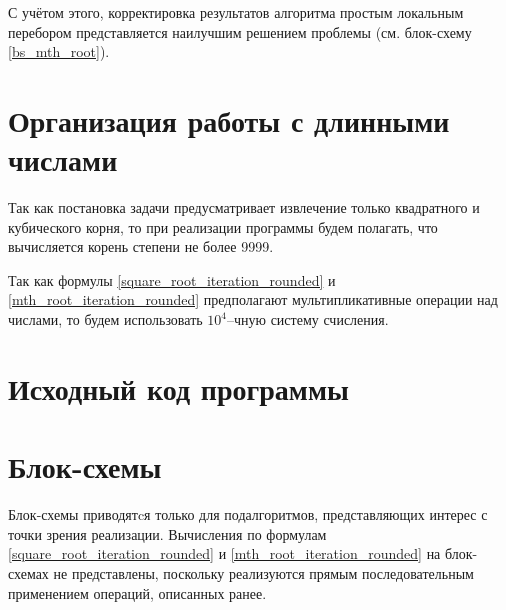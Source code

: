 \documentclass[a4paper,12pt]{article} %
\begin{document}
С учётом этого, корректировка результатов алгоритма простым локальным перебором
представляется наилучшим решением проблемы (см. блок-схему \ref{bs_mth_root}).


\section*{Организация работы с длинными числами}
Так как постановка задачи предусматривает извлечение только квадратного и кубического корня,
то при реализации программы будем полагать, что вычисляется корень степени не более 9999.

Так как формулы \eqref{square_root_iteration_rounded} и \eqref{mth_root_iteration_rounded}
предполагают мультипликативные операции над числами,
то будем использовать $10^4$--чную систему счисления.

\section*{Исходный код программы}







\section*{Блок-схемы}

Блок-схемы приводятcя только для подалгоритмов, представляющих интерес с точки зрения реализации.
Вычисления по формулам \eqref{square_root_iteration_rounded} и \eqref{mth_root_iteration_rounded}
на блок-схемах не представлены,
поскольку реализуются прямым последовательным применением операций, описанных ранее.
\end{document}
